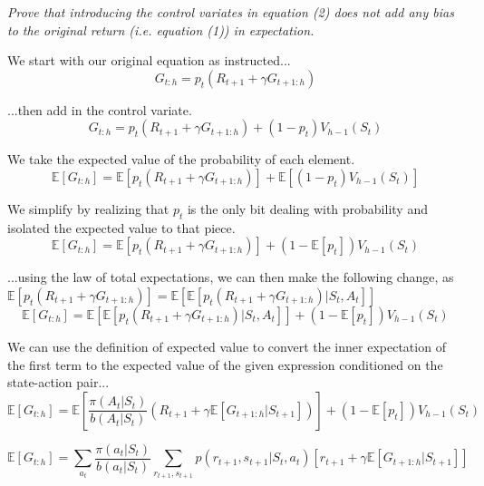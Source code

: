 \documentclass{article}
\begin{document}
\textit{Prove that introducing the control variates in equation (2) does not add any bias to the original return (i.e. equation (1)) in expectation.}


We start with our original equation as instructed...
\begin{equation}
    G_{t:h} = p_t(R_{t+1} + \gamma G_{t+1:h})
\end{equation}

...then add in the control variate.
\begin{equation}
    G_{t:h} = p_t(R_{t+1}+\gamma G_{t+1:h}) + (1-p_t) V_{h-1} (S_t)
\end{equation}

We take the expected value of the probability of each element.
\begin{equation}
    \mathbb{E}[G_{t:h}] = \mathbb{E}[p_t(R_{t+1} + \gamma G_{t+1:h})] + \mathbb{E}[(1-p_t) V_{h-1} (S_t)]
\end{equation}

We simplify by realizing that $p_t$ is the only bit dealing with probability and isolated the expected value to that piece.
\begin{equation}
    \mathbb{E}[G_{t:h}] = \mathbb{E}[p_t(R_{t+1} + \gamma G_{t+1:h})] + (1-\mathbb{E}[p_t]) V_{h-1} (S_t)
\end{equation}

...using the law of total expectations, we can then make the following change, as $\mathbb{E}[p_t(R_{t+1} + \gamma G_{t+1:h})] = \mathbb{E}[\mathbb{E}[p_t(R_{t+1} + \gamma G_{t+1:h})|S_t, A_t]]$
\begin{equation}
    \mathbb{E}[G_{t:h}] = \mathbb{E}[\mathbb{E}[p_t(R_{t+1} + \gamma G_{t+1:h})|S_t,A_t]] + (1-\mathbb{E}[p_t]) V_{h-1} (S_t)
\end{equation}

We can use the definition of expected value to convert the inner expectation of the first term to the expected value of the given expression conditioned on the state-action pair...
\begin{equation}
    \mathbb{E}[G_{t:h}] = \mathbb{E}[\frac{\pi(A_t|S_t)}{b(A_t|S_t)}(R_{t+1} + \gamma \mathbb{E}[G_{t+1:h}|S_{t+1}])] + (1-\mathbb{E}[p_t]) V_{h-1} (S_t)
\end{equation}

\begin{equation}
    \mathbb{E}[G_{t:h}] = \sum_{a_t}\frac{\pi(a_t|S_t)}{b(a_t|S_t)}\sum_{r_{t+1},s_{t+1}}p(r_{t+1},s_{t+1}|S_t,a_t)[r_{t+1} + \gamma \mathbb{E}[G_{t+1:h}|S_{t+1}]]
\end{equation}
\end{document}
